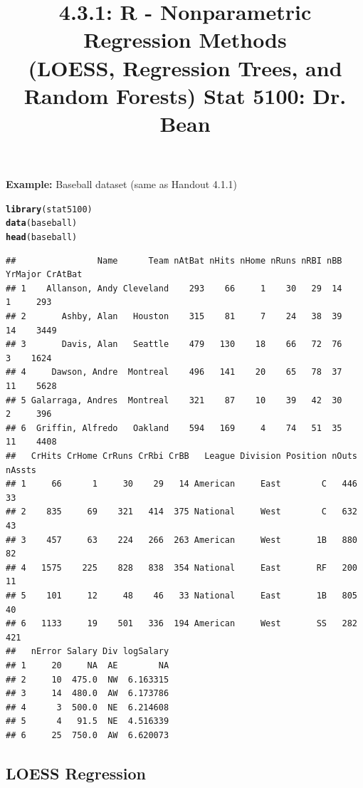 \documentclass{article}\usepackage[]{graphicx}\usepackage[]{color}
\makeatletter
\newcommand{\hlstd}[1]{\textcolor[rgb]{0.345,0.345,0.345}{#1}}%
\newcommand{\hlkwd}[1]{\textcolor[rgb]{0.737,0.353,0.396}{\textbf{#1}}}%
\newenvironment{kframe}{%
 \def\at@end@of@kframe{}%
 \ifinner\ifhmode%
  \def\at@end@of@kframe{\end{minipage}}%
  \begin{minipage}{\columnwidth}%
 \fi\fi%
 \def\FrameCommand##1{\hskip\@totalleftmargin \hskip-\fboxsep
 \colorbox{shadecolor}{##1}\hskip-\fboxsep
     \hskip-\linewidth \hskip-\@totalleftmargin \hskip\columnwidth}%
 \MakeFramed {\advance\hsize-\width
   \@totalleftmargin\z@ \linewidth\hsize
   \@setminipage}}%
 {\par\unskip\endMakeFramed%
 \at@end@of@kframe}
\newenvironment{knitrout}{}{} %
\makeatother
\begin{document}
\title{%
  4.3.1: R - Nonparametric Regression Methods \\
  (LOESS, Regression Trees, and Random Forests)
  \smallskip
  \large Stat 5100: Dr. Bean
}
\date{}

\maketitle

\textbf{Example: } Baseball dataset (same as Handout 4.1.1)

\begin{knitrout}
\color{fgcolor}\begin{kframe}
\begin{alltt}
\hlkwd{library}\hlstd{(stat5100)}
\hlkwd{data}\hlstd{(baseball)}
\hlkwd{head}\hlstd{(baseball)}
\end{alltt}
\begin{verbatim}
##                Name      Team nAtBat nHits nHome nRuns nRBI nBB YrMajor CrAtBat
## 1    Allanson, Andy Cleveland    293    66     1    30   29  14       1     293
## 2       Ashby, Alan   Houston    315    81     7    24   38  39      14    3449
## 3       Davis, Alan   Seattle    479   130    18    66   72  76       3    1624
## 4     Dawson, Andre  Montreal    496   141    20    65   78  37      11    5628
## 5 Galarraga, Andres  Montreal    321    87    10    39   42  30       2     396
## 6  Griffin, Alfredo   Oakland    594   169     4    74   51  35      11    4408
##   CrHits CrHome CrRuns CrRbi CrBB   League Division Position nOuts nAssts
## 1     66      1     30    29   14 American     East        C   446     33
## 2    835     69    321   414  375 National     West        C   632     43
## 3    457     63    224   266  263 American     West       1B   880     82
## 4   1575    225    828   838  354 National     East       RF   200     11
## 5    101     12     48    46   33 National     East       1B   805     40
## 6   1133     19    501   336  194 American     West       SS   282    421
##   nError Salary Div logSalary
## 1     20     NA  AE        NA
## 2     10  475.0  NW  6.163315
## 3     14  480.0  AW  6.173786
## 4      3  500.0  NE  6.214608
## 5      4   91.5  NE  4.516339
## 6     25  750.0  AW  6.620073
\end{verbatim}
\end{kframe}
\end{knitrout}

\subsection*{LOESS Regression}
\end{document}
